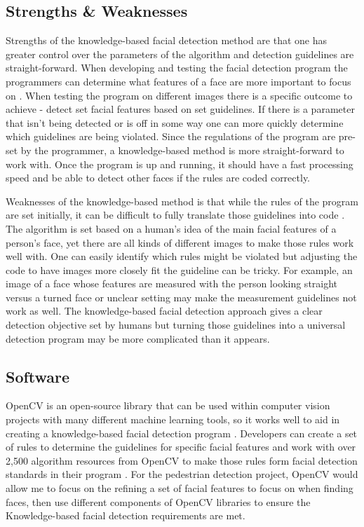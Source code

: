 \documentclass[onecolumn, draftclsnofoot,10pt, compsoc]{IEEEtran}
\begin{document}
\subsection{Strengths \& Weaknesses}
Strengths of the knowledge-based facial detection method are that one has greater control over the parameters of the algorithm and detection guidelines are straight-forward. When developing and testing the facial detection program the programmers can determine what features of a face are more important to focus on \cite{Medium}. When testing the program on different images there is a specific outcome to achieve - detect set facial features based on set guidelines. If there is a parameter that isn't being detected or is off in some way one can more quickly determine which guidelines are being violated. Since the regulations of the program are pre-set by the programmer, a knowledge-based method is more straight-forward to work with. Once the program is up and running, it should have a fast processing speed and be able to detect other faces if the rules are coded correctly.

Weaknesses of the knowledge-based method is that while the rules of the program are set initially, it can be difficult to fully translate those guidelines into code \cite{Detection}. The algorithm is set based on a human's idea of the main facial features of a person's face, yet there are all kinds of different images to make those rules work well with. One can easily identify which rules might be violated but adjusting the code to have images more closely fit the guideline can be tricky. For example, an image of a face whose features are measured with the person looking straight versus a turned face or unclear setting may make the measurement guidelines not work as well. The knowledge-based facial detection approach gives a clear detection objective set by humans but turning those guidelines into a universal detection program may be more complicated than it appears. 

\subsection{Software}
OpenCV is an open-source library that can be used within computer vision projects with many different machine learning tools, so it works well to aid in creating a knowledge-based facial detection program \cite{OpenCV}. Developers can create a set of rules to determine the guidelines for specific facial features and work with over 2,500 algorithm resources from OpenCV to make those rules form facial detection standards in their program \cite{OpenCV}. For the pedestrian detection project, OpenCV would allow me to focus on the refining a set of facial features to focus on when finding faces, then use different components of OpenCV libraries to ensure the Knowledge-based facial detection requirements are met.
\end{document}

